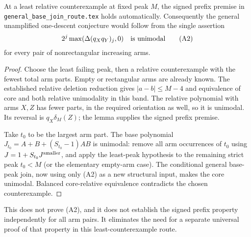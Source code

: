 \begin{corollary}
At a least relative counterexample at fixed peak $M$, the signed
prefix premise in \texttt{general\_base\_join\_route.tex} holds
automatically. Consequently the general unamplified one-descent
conjecture would follow from the single assertion
\[
       2^j\max(\Delta(q_Xq_Y)_j,0)\quad\hbox{is unimodal}
       \tag{A2}
\]
for every pair of nonrectangular increasing arms.
\end{corollary}
\begin{proof}
Choose the least failing peak, then a relative counterexample with
the fewest total arm parts. Empty or rectangular arms are already
known. The established relative deletion reduction gives
$|a-b|\le M-4$ and equivalence of core and both relative
unimodality in this band. The relative polynomial with arms
$X,Z$ has fewer parts, in the required orientation as well,
so it is unimodal. Its reversal is $q_X\delta_M(Z)$; the lemma
supplies the signed prefix premise.

Take $t_0$ to be the largest arm part. The base polynomial
$J_{t_0}=A+B+(S_{t_0}-1)AB$ is unimodal: remove all arm
occurrences of $t_0$ using $J=1+S_{t_0}J^{\rm smaller}$,
and apply the least-peak hypothesis to the remaining strict
peak $t_0<M$ (or the elementary empty-arm case).
The conditional general base-peak join, now using only (A2)
as a new structural input, makes the core unimodal. Balanced
core-relative equivalence contradicts the chosen counterexample.
\end{proof}

This does not prove (A2), and it does not establish the signed
prefix property independently for all arm pairs. It eliminates
the need for a separate universal proof of that property in
this least-counterexample route.

